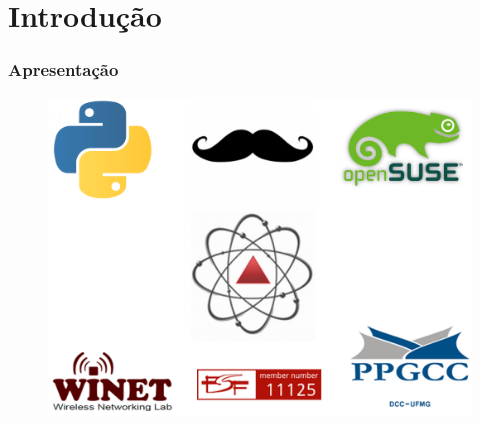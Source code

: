 %
%
\section{Introdução}


%
%
\begin{frame}\frametitle{Apresentação}

	\begin{figure}[h]
        \centering
        \includegraphics[scale=0.25]{images/community.png}
    \end{figure}
\end{frame}

